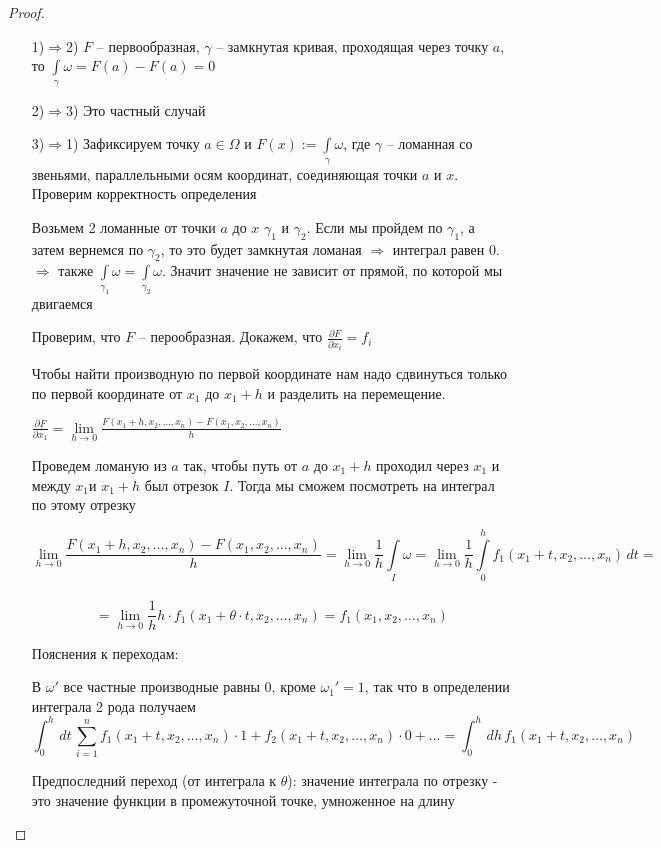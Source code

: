 \begin{proof}\thmslashn
	
	\begin{enumerate}
		\item[1)$\Rightarrow$2)] 
		$F$ -- первообразная, $\gamma$ -- замкнутая кривая, проходящая через точку $a$, то $\int\limits_\gamma \omega = F(a) - F(a) = 0$
		
		\item[2)$\Rightarrow$3)]
		Это частный случай
		
		
		\item[3)$\Rightarrow$1)]
		Зафиксируем точку $a \in \Omega$ и $F(x) := \int\limits_\gamma \omega$, где $\gamma$ -- ломанная со звеньями, параллельными осям координат, соединяющая точки $a$ и $x$. Проверим корректность определения
		
		Возьмем 2 ломанные от точки $a$ до $x$ $\gamma_1$ и $\gamma_2$. Если мы пройдем по $\gamma_1$, а затем вернемся по $\gamma_2$, то это будет замкнутая ломаная $\Rightarrow$ интеграл равен 0. $\Rightarrow$ также $\int\limits_{\gamma_1} \omega = \int\limits_{\gamma_2} \omega$. Значит значение не зависит от прямой, по которой мы двигаемся
		
		Проверим, что $F$ -- перообразная. Докажем, что $\frac{\partial F}{\partial x_i} = f_i$
		
		Чтобы найти производную по первой координате нам надо сдвинуться только по первой координате от $x_1$ до $x_1 + h$ и разделить на перемещение.
		
		$\frac{\partial F}{\partial x_1} = \lim\limits_{h\to 0} \frac{F(x_1+h, x_2, \ldots, x_n) - F(x_1, x_2, \ldots, x_n)}{h} $
		
		Проведем ломаную из $a$ так, чтобы путь от $a$ до $x_1 + h$ проходил через $x_1$ и между $x_1$и $x_1 + h$ был отрезок $I$. Тогда мы сможем посмотреть на интеграл по этому отрезку
		
		\[\lim\limits_{h\to 0} \frac{F(x_1+h, x_2, \ldots, x_n) - F(x_1, x_2, \ldots, x_n)}{h} = \lim\limits_{h\to 0} \frac{1}{h} \int\limits_I \omega = 
        \lim\limits_{h\to 0} \frac{1}{h} \int\limits_0^h f_1(x_1+t, x_2, \ldots, x_n) \,dt = \]\\\[ =
        \lim\limits_{h\to 0} \frac{1}{h} h \cdot f_1(x_1 + \theta \cdot t, x_2, \ldots, x_n) = 
    f_1(x_1, x_2, \ldots, x_n)\]


        Пояснения к переходам:

    В $\omega'$ все частные производные равны 0, кроме $\omega_1' = 1$, так что в определении интеграла 2 рода получаем \[\int_0^h\, dt\, \sum_{i=1}^n f_1(x_1+t, x_2, \ldots, x_n) \cdot 1 + f_2(x_1+t, x_2, \ldots, x_n) \cdot 0 + \ldots = \int_0^h\, dh\, f_1(x_1 + t, x_2, \ldots, x_n)\]

        Предпоследний переход (от интеграла к $\theta$): значение интеграла по отрезку - это значение функции в промежуточной точке, умноженное на длину
		
	\end{enumerate}

\end{proof}